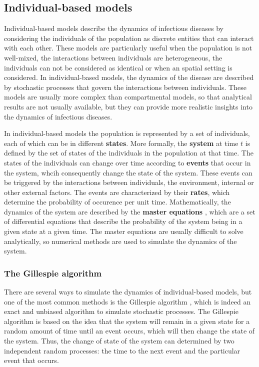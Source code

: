 \subsection{\label{sec:Individual-based models} Individual-based models}

Individual-based models describe the dynamics of infectious diseases by
considering the individuals of the population as discrete entities that can
interact with each other. These models are particularly useful when the
population is not well-mixed, the interactions between individuals are
heterogeneous, the individuals can not be considered as identical or when an
spatial setting is considered. In individual-based models, the dynamics of the
disease are described by stochastic processes that govern the interactions
between individuals. These models are usually more complex than compartmental
models, so that analytical results are not usually available, but they can
provide more realistic insights into the dynamics of infectious diseases.

In individual-based models the population is represented by a set of
individuals, each of which can be in different \textbf{states}. More formally,
the \textbf{system} at time $t$ is defined by the set of states of the
individuals in the population at that time. The states of the individuals can
change over time according to \textbf{events} that occur in the system, whcih
consequently change the state of the system. These events can be triggered by
the interactions between individuals, the environment, internal or other
external factors. The events are characterized by their \textbf{rates}, which
determine the probability of occurence per unit time. Mathematically, the
dynamics of the system are described by the \textbf{master equations}
\cite{Toral_master_eqs}, which are a set of differential equations that
describe the probability of the system being in a given state at a given time.
The master equations are usually difficult to solve analytically, so numerical
methods are used to simulate the dynamics of the system.

\subsubsection*{The Gillespie algorithm}

There are several ways to simulate the dynamics of individual-based models, but
one of the most common methods is the Gillespie algorithm \cite{Gillespie1977},
which is indeed an exact and unbiased algorithm to simulate stochastic
processes. The Gillespie algorithm is based on the idea that the system will
remain in a given state for a random amount of time until an event occurs,
which will then change the state of the system. Thus, the change of state of
the system can determined by two independent random processes: the time to the
next event and the particular event that occurs.

